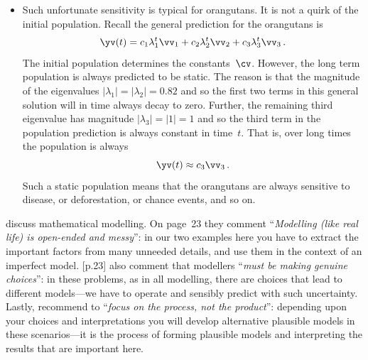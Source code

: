 \begin{example}
\begin{solution}
\begin{itemize}
\item Such unfortunate sensitivity is typical for orangutans.  
It is not a quirk of the initial population.
Recall the general prediction for the orangutans is 
\begin{equation*}
\yv(t)=c_1\lambda_1^t\vv_1+c_2\lambda_2^t\vv_2+c_3\lambda_3^t\vv_3\,.
\end{equation*}
The initial population determines the constants~\(\cv\).
However, the long term population is always predicted to be static.
The reason is that the magnitude of the eigenvalues \(|\lambda_1|=|\lambda_2|=0.82\) and so the first two terms in this general solution will in time always decay to zero.
Further, the remaining third eigenvalue has magnitude \(|\lambda_3|=|1|=1\) and so the third term in the population prediction is always constant in time~\(t\).
That is, over long times the population is always
\begin{equation*}
\yv(t)\approx c_3\vv_3\,.
\end{equation*}
Such a static population means that the orangutans are always sensitive to  disease, or deforestation, or chance events, and so on.

\end{itemize}
\end{solution}
\end{example}




\cite{gaimme2016} discuss mathematical modelling.
On page~23 they comment ``\emph{Modelling (like real life) is open-ended and messy}'': in our two examples here you have to extract the important factors from many unneeded details, and use them in the context of an imperfect model.
\cite{gaimme2016} [p.23] also comment that modellers ``\emph{must be making genuine choices}'': in these problems, as in all modelling, there are choices that lead to different models---we have to operate and sensibly predict with such uncertainty.
Lastly, \cite{gaimme2016} recommend to ``\emph{focus on the process, not the product}'': depending upon your choices and interpretations you will develop alternative plausible models in these scenarios---it is the process of forming plausible models and interpreting the results that are important here.



